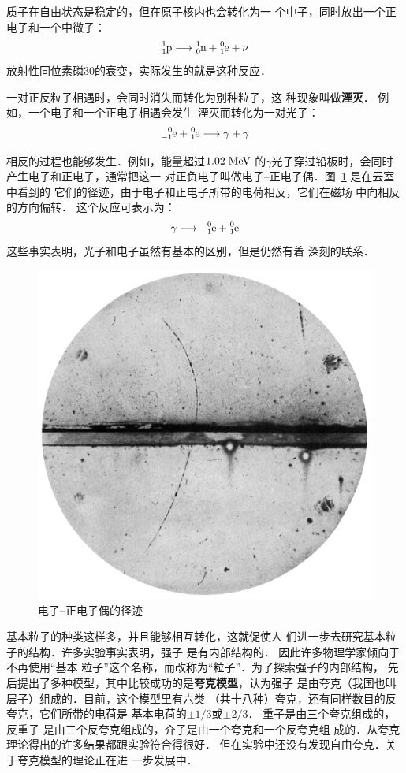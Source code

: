 质子在自由状态是稳定的，但在原子核内也会转化为一
个中子，同时放出一个正电子和一个中微子：
\[\atom{p}{1}{1}\longrightarrow \atom{n}{1}{0}+\atom{e}{0}{1}+\nu   \]
放射性同位素磷30的衰变，实际发生的就是这种反应．

一对正反粒子相遇时，会同时消失而转化为别种粒子，这
种现象叫做\textbf{湮灭}．
例如，一个电子和一个正电子相遇会发生
湮灭而转化为一对光子：
\[\atom{e}{0}{-1}+\atom{e}{0}{1}\longrightarrow \gamma+\gamma  \]

相反的过程也能够发生．例如，能量超过$1.02 \;\text{MeV}$
的$\gamma$光子穿过铅板时，会同时产生电子和正电子，通常把这一
对正负电子叫做电子--正电子偶．图~\ref{fig_C_9-16} 是在云室中看到的
它们的径迹，由于电子和正电子所带的电荷相反，它们在磁场
中向相反的方向偏转．
这个反应可表示为：
\[\gamma\longrightarrow \atom{e}{0}{-1}+\atom{e}{0}{1} \]
这些事实表明，光子和电子虽然有基本的区别，但是仍然有着
深刻的联系．
\begin{figure}[htbp]
    \centering
    \includegraphics{fig/C/9-16.jpg}
    \caption{电子--正电子偶的径迹}\label{fig_C_9-16}
\end{figure}



基本粒子的种类这样多，并且能够相互转化，这就促使人
们进一步去研究基本粒子的结构．许多实验事实表明，强子
是有内部结构的．
因此许多物理学家倾向于不再使用“基本
粒子”这个名称，而改称为“粒子”．为了探索强子的内部结构，
先后提出了多种模型，其中比较成功的是\textbf{夸克模型}，认为强子
是由夸克（我国也叫层子）组成的．目前，这个模型里有六类
（共十八种）夸克，还有同样数目的反夸克，它们所带的电荷是
基本电荷的$\pm1/3$或$\pm 2/3$．
重子是由三个夸克组成的，反重子
是由三个反夸克组成的，介子是由一个夸克和一个反夸克组
成的．从夸克理论得出的许多结果都跟实验符合得很好．
但在实验中还没有发现自由夸克．关于夸克模型的理论正在进
一步发展中．

